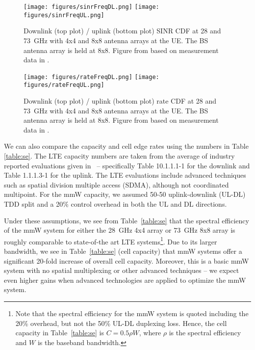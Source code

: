 \documentclass[journal]{IEEEtran}
\begin{document}
\begin{figure}
    \centering
    \texttt{[image: figures/sinrFreqDL.png]}
    \texttt{[image: figures/sinrFreqUL.png]}
    \caption{Downlink (top plot) / uplink (bottom plot) SINR CDF
        at 28 and 73~GHz with 4x4 and 8x8 antenna arrays at the UE.
        The BS antenna array is held at 8x8.
        Figure from \cite{AkLiuRanRapEr:13-arxiv} based on measurement data in
        \cite{rappaportmillimeter}.}
    \label{fig:sinrGeoTxPow}
\end{figure}
\begin{figure}
    \centering
    \texttt{[image: figures/rateFreqDL.png]}
    \texttt{[image: figures/rateFreqUL.png]}
    \caption{Downlink (top plot) / uplink (bottom plot) rate CDF
    at 28 and 73~GHz with 4x4 and 8x8 antenna arrays at the UE.
    The BS antenna array is held at 8x8.
    Figure from \cite{AkLiuRanRapEr:13-arxiv} based on measurement data in
        \cite{rappaportmillimeter}.}
    \label{fig:rateGeoTxPow}
\end{figure}

We can also compare the capacity and cell edge rates using the numbers in
Table \ref{table:se}.
The LTE capacity numbers are taken from the average of industry
reported evaluations given in~\cite{3GPP36.814}
-- specifically Table 10.1.1.1-1 for the downlink
and Table 1.1.1.3-1 for the uplink.  The LTE evaluations include
advanced techniques such as spatial division multiple access (SDMA),
although not coordinated multipoint.
For the mmW capacity, we assumed 50-50 uplink-downlink (UL-DL) TDD split and a 20\%
control overhead in both the UL and DL directions.

Under these assumptions, we see from Table~\ref{table:se}
that the spectral efficiency of the mmW system
for either the 28~GHz 4x4 array or 73~GHz 8x8 array is roughly comparable
to state-of-the art LTE
systems\footnote{Note that the spectral efficiency for the mmW
system is quoted including the 20\% overhead, but not the 50\% UL-DL duplexing loss.
Hence, the cell capacity in Table~\ref{table:se} is $C = 0.5\rho W$, where
$\rho$ is the spectral efficiency and $W$ is the baseband bandwidth.}.
Due to its larger bandwidth, we see in Table~\ref{table:se} (cell capacity)
that  mmW systems offer
a significant 20-fold
increase of overall cell capacity.
Moreover, this is a basic mmW system with no spatial multiplexing or other advanced
techniques --  we expect even higher gains when advanced technologies are applied to optimize the mmW system.
\end{document}
